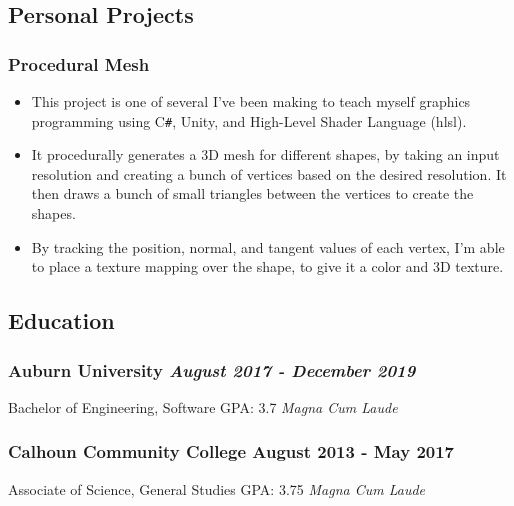 \documentclass{article}
\begin{document}
\subsection*{Personal Projects}
\subsubsection*{\hspace*{0.15cm} Procedural Mesh}

\begin{itemize}
    \item This project is one of several I've been making to teach myself 
     graphics programming using C\verb|#|, Unity, and High-Level Shader Language (hlsl).
    \item It procedurally generates a 3D mesh for different shapes, by taking
     an input resolution and creating a bunch of vertices based on the desired resolution.
     It then draws a bunch of small triangles between the vertices to create the
     shapes. 
    \item By tracking the position, normal, and tangent values of each vertex, I'm
     able to place a texture mapping over the shape, to give it a color and 3D texture. 
\end{itemize}


\subsection*{Education}
\subsubsection*{\hspace*{0.15cm}Auburn University \hfill \textit{August 2017 - December 2019}}
\hspace*{0.15cm}Bachelor of Engineering, Software \hfill GPA: 3.7 \textit{Magna Cum Laude}
\subsubsection*{\hspace*{0.15cm}Calhoun Community College \hfill August 2013 - May 2017}
\hspace*{0.15cm}Associate of Science, General Studies \hfill GPA: 3.75 \textit{Magna Cum Laude}
\end{document}
